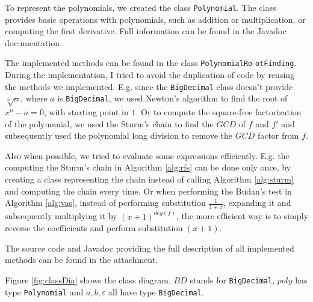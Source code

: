 \documentclass[
  digital, %
  notable,   %
  nolof,     %
  nolot,     %
	final, %
]{fithesis3}
\begin{document}
To represent the polynomials, we created the class \texttt{Polynomial}. The class provides basic operations with polynomials, such as addition or multiplication, or computing the first derivative. Full information can be found in the Javadoc documentation.

The implemented methods can be found in the class \texttt{PolynomialRo}-\texttt{otFinding}. During the implementation, I tried to avoid the duplication of code by reusing the methods we implemented. E.g. since the \texttt{BigDecimal} class doesn't provide $\sqrt[n]{a}$, where $a$ is \texttt{BigDecimal}, we used Newton's algorithm to find the root of $x^{n}-a=0$, with starting point in $1$. Or to compute the square-free factorization of the polynomial, we used the Sturm's chain to find the $GCD$ of $f$ and $f'$ and subsequently used the polynomial long division to remove the $GCD$ factor from $f$.

Also when possible, we tried to evaluate some expressions efficiently. E.g. the computing the Sturm's chain in Algorithm \ref{alg:rfs} can be done only once, by creating a class representing the chain instead of calling Algorithm \ref{alg:sturm} and computing the chain every time. Or when performing the Budan's test in Algorithm \ref{alg:vas}, instead of performing substitution $\frac{1}{1+x}$, expanding it and subsequently multiplying it by $(x+1)^{deg(f)}$, the more efficient way is to simply reverse the coefficients and perform substitution $(x+1)$.

The source code and Javadoc providing the full description of all implemented methods can be found in the attachment.

Figure \ref{fig:classDia} shows the class diagram. $BD$ stands for \texttt{BigDecimal}, $poly$ has type \texttt{Polynomial} and $a, b, \varepsilon$ all have type \texttt{BigDecimal}.
\end{document}
